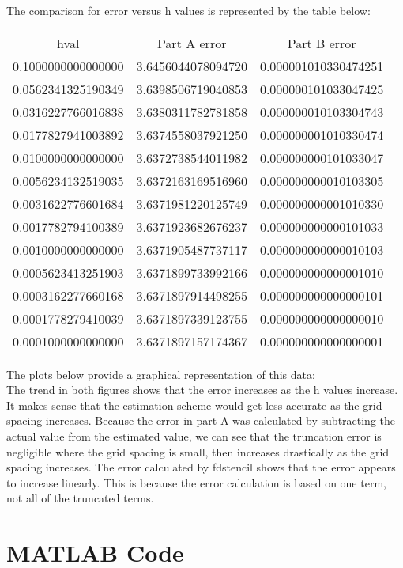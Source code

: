 \documentclass[titlepage]{article}
\begin{document}
The comparison for error versus h values is represented by the table below:\\
\begin{center}
\begin{tabular}{ c c c }
 hval & Part A error & Part B error \\ 
0.1000000000000000 & 3.6456044078094720 & 0.000001010330474251 \\ 
0.0562341325190349 & 3.6398506719040853 & 0.000000101033047425 \\ 
0.0316227766016838 & 3.6380311782781858 & 0.000000010103304743 \\ 
0.0177827941003892 & 3.6374558037921250 & 0.000000001010330474 \\ 
0.0100000000000000 & 3.6372738544011982 & 0.000000000101033047 \\ 
0.0056234132519035 & 3.6372163169516960 & 0.000000000010103305 \\ 
0.0031622776601684 & 3.6371981220125749 & 0.000000000001010330 \\ 
0.0017782794100389 & 3.6371923682676237 & 0.000000000000101033 \\ 
0.0010000000000000 & 3.6371905487737117 & 0.000000000000010103 \\ 
0.0005623413251903 & 3.6371899733992166 & 0.000000000000001010 \\ 
0.0003162277660168 & 3.6371897914498255 & 0.000000000000000101 \\ 
0.0001778279410039 & 3.6371897339123755 & 0.000000000000000010 \\ 
0.0001000000000000 & 3.6371897157174367 & 0.000000000000000001 
\end{tabular}
\end{center}

The plots below provide a graphical representation of this data: \\

The trend in both figures shows that the error increases as the h values increase. It makes sense that the estimation scheme would get less accurate as the grid spacing increases. Because the error in part A was calculated by subtracting the actual value from the estimated value, we can see that the truncation error is negligible where the grid spacing is small, then increases drastically as the grid spacing increases. The error calculated by fdstencil shows that the error appears to increase linearly. This is because the error calculation is based on one term, not all of the truncated terms. \\

\begin{figure}[ht!]
    \centering
\end{figure}

\begin{figure}[ht!]
    \centering
\end{figure}

\newpage
\appendix
\section{MATLAB Code}
\end{document}
